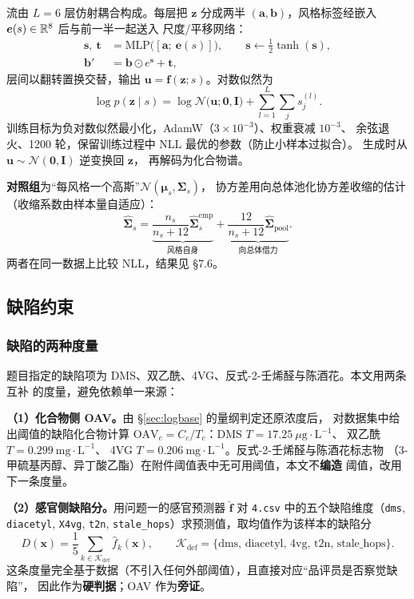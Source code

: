 流由 $L=6$ 层仿射耦合构成。每层把 $\bm{z}$ 分成两半
$(\bm{a},\bm{b})$，风格标签经嵌入 $\bm{e}(s)\in\mathbb{R}^{8}$ 后与前一半一起送入
尺度/平移网络：
\begin{align}
\bm{s},\ \bm{t} &= \mathrm{MLP}\big([\bm{a};\ \bm{e}(s)]\big),\qquad
\bm{s}\leftarrow \tfrac12\tanh(\bm{s}),\\
\bm{b}' &= \bm{b}\odot e^{\bm{s}}+\bm{t},
\label{eq:coupling}
\end{align}
层间以翻转置换交替，输出 $\bm{u}=\bm{f}(\bm{z};s)$。对数似然为
\begin{equation}
\log p(\bm{z}\mid s)=\log\mathcal{N}\big(\bm{u};\bm{0},\bm{I}\big)
+\sum_{l=1}^{L}\sum_{j}s^{(l)}_j .
\label{eq:flowll}
\end{equation}
训练目标为负对数似然最小化，AdamW（$3\times10^{-3}$）、权重衰减 $10^{-3}$、
余弦退火、1200 轮，保留训练过程中 NLL 最优的参数（防止小样本过拟合）。
生成时从 $\bm{u}\sim\mathcal{N}(\bm{0},\bm{I})$ 逆变换回 $\bm{z}$，
再解码为化合物谱。

\textbf{对照组}为“每风格一个高斯”$\mathcal{N}(\bm{\mu}_s,\bm{\Sigma}_s)$，
协方差用向总体池化协方差收缩的估计（收缩系数由样本量自适应）：
\begin{equation}
\hat{\bm{\Sigma}}_s=\underbrace{\frac{n_s}{n_s+12}\hat{\bm{\Sigma}}_s^{\mathrm{emp}}}_{\text{风格自身}}
+\underbrace{\frac{12}{n_s+12}\hat{\bm{\Sigma}}_{\mathrm{pool}}}_{\text{向总体借力}} .
\label{eq:shrink}
\end{equation}
两者在同一数据上比较 NLL，结果见 \S7.6。

\subsection{缺陷约束}

\subsubsection{缺陷的两种度量}

题目指定的缺陷项为 DMS、双乙酰、4VG、反式-2-壬烯醛与陈酒花。本文用两条互补
的度量，避免依赖单一来源：

\textbf{（1）化合物侧 OAV。}由 \S\ref{sec:logbase} 的量纲判定还原浓度后，
对数据集中给出阈值的缺陷化合物计算
$\mathrm{OAV}_c=C_c/T_c$：DMS $T=17.25\ \mu\mathrm{g\cdot L^{-1}}$、
双乙酰 $T=0.299\ \mathrm{mg\cdot L^{-1}}$、
4VG $T=0.206\ \mathrm{mg\cdot L^{-1}}$。反式-2-壬烯醛与陈酒花标志物
（3-甲硫基丙醇、异丁酸乙酯）在附件阈值表中无可用阈值，本文不\textbf{编造}
阈值，改用下一条度量。

\textbf{（2）感官侧缺陷分。}用问题一的感官预测器 $\hat{\bm{f}}$ 对 \texttt{4.csv}
中的五个缺陷维度（\texttt{dms}, \texttt{diacetyl}, \texttt{X4vg}, \texttt{t2n},
\texttt{stale\_hops}）求预测值，取均值作为该样本的缺陷分
\begin{equation}
D(\bm{x})=\frac{1}{5}\sum_{k\in\mathcal{K}_{\mathrm{def}}}\hat f_k(\bm{x}),
\qquad \mathcal{K}_{\mathrm{def}}=\{\text{dms, diacetyl, 4vg, t2n, stale\_hops}\}.
\label{eq:defscore}
\end{equation}
这条度量完全基于数据（不引入任何外部阈值），且直接对应“品评员是否察觉缺陷”，
因此作为\textbf{硬判据}；OAV 作为\textbf{旁证}。

